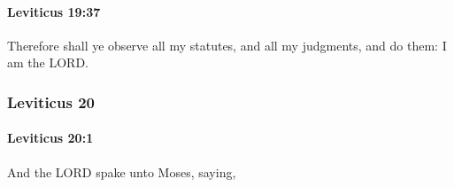		\paragraph{Leviticus 19:37} %
			\label{LEVITICUS-19-37}

			Therefore shall ye observe all my statutes, and all my judgments, and do them: I am the LORD.

	\subsubsection{Leviticus 20} %
		\label{LEVITICUS-20}

		\paragraph{Leviticus 20:1} %
			\label{LEVITICUS-20-1}

			And the LORD spake unto Moses, saying,

